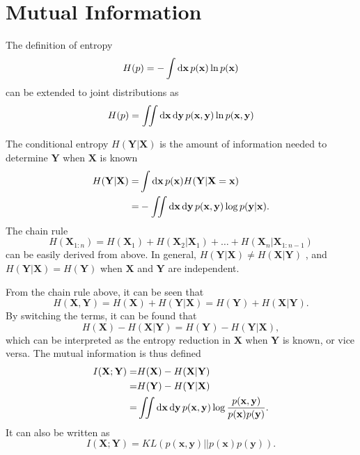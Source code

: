 \section{Mutual Information\label{Sec:Eva:MI}}
The definition of entropy
\begin{equation}
	H(p)=-\int \mathop{}\!\mathrm{d} \mathbf{x}\, p(\mathbf{x})\ln p(\mathbf{x})
\end{equation}
can be extended to joint distributions as
\begin{equation}
	H(p)=\iint \mathop{}\!\mathrm{d} \mathbf{x}\mathop{}\!\mathrm{d} \mathbf{y}\, p(\mathbf{x},\mathbf{y})\ln p(\mathbf{x},\mathbf{y})
\end{equation}

The conditional entropy $H(\mathbf{Y}|\mathbf{X})$ is the amount of information needed to determine $\mathbf{Y}$ when $\mathbf{X}$ is known
\begin{align}
	H(\mathbf{Y}|\mathbf{X})=&\int \mathop{}\!\mathrm{d} \mathbf{x}\, p(\mathbf{x})  H(\mathbf{Y}|\mathbf{X}=\mathbf{x})\notag\\
	  =&-\iint \mathop{}\!\mathrm{d} \mathbf{x}\mathop{}\!\mathrm{d} \mathbf{y}\, p(\mathbf{x},\mathbf{y})\log{p(\mathbf{y}|\mathbf{x})}.
\end{align}
The chain rule
\begin{equation}
	H(\mathbf{X}_{1:n})=H(\mathbf{X}_1)+H(\mathbf{X}_2|\mathbf{X}_1)+\dots+H(\mathbf{X}_n|\mathbf{X}_{1:n-1})
\end{equation}
can be easily derived from above. In general, $H(\mathbf{Y}|\mathbf{X})\neq H(\mathbf{X}|\mathbf{Y})$ , and $H(\mathbf{Y}|\mathbf{X})=H(\mathbf{Y})$ when $\mathbf{X}$ and $\mathbf{Y}$ are independent.

From the chain rule above, it can be seen that
\begin{equation}
	H(\mathbf{X},\mathbf{Y})=H(\mathbf{X})+H(\mathbf{Y}|\mathbf{X})=H(\mathbf{Y})+H(\mathbf{X}|\mathbf{Y}).
\end{equation}
By switching the terms, it can be found that
\begin{equation}
	H(\mathbf{X})-H(\mathbf{X}|\mathbf{Y})=H(\mathbf{Y})-H(\mathbf{Y}|\mathbf{X}),
\end{equation}
which can be interpreted as the entropy reduction in $\mathbf{X}$ when $\mathbf{Y}$ is known, or vice versa. The mutual information is thus defined
\begin{align}
	I(\mathbf{X};\mathbf{Y})=&H(\mathbf{X})-H(\mathbf{X}|\mathbf{Y})\notag\\
	=&H(\mathbf{Y})-H(\mathbf{Y}|\mathbf{X})\notag\\
	=&\iint \mathop{}\!\mathrm{d} \mathbf{x}\mathop{}\!\mathrm{d} \mathbf{y}\, p(\mathbf{x},\mathbf{y})\log{\frac{p(\mathbf{x},\mathbf{y})}{p(\mathbf{x})p(\mathbf{y})}}.
\end{align}
It can also be written as
\begin{equation}
	I(\mathbf{X};\mathbf{Y})=KL\left(p(\mathbf{x},\mathbf{y})||p(\mathbf{x})p(\mathbf{y})\right).
\end{equation}

